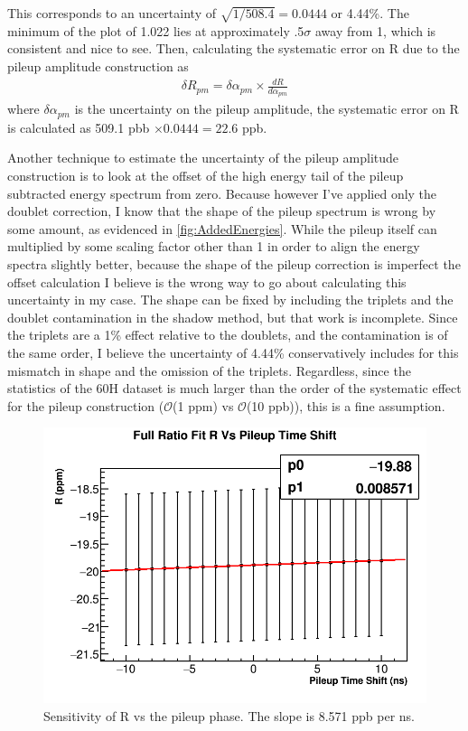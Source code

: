 This corresponds to an uncertainty of $\sqrt{1/508.4} = 0.0444$ or 4.44\%. The minimum of the \chisq plot of 1.022 lies at approximately .5$\sigma$ away from 1, which is consistent and nice to see. Then, calculating the systematic error on R due to the pileup amplitude construction as 
	\begin{align}
		\delta R_{pm} = \delta\alpha_{pm} \times \frac{dR}{d\alpha_{pm}}
	\end{align}
where $\delta\alpha_{pm}$ is the uncertainty on the pileup amplitude, the systematic error on R is calculated as 509.1 pbb $\times 0.0444 = 22.6$ ppb.

Another technique to estimate the uncertainty of the pileup amplitude construction is to look at the offset of the high energy tail of the pileup subtracted energy spectrum from zero. Because however I've applied only the doublet correction, I know that the shape of the pileup spectrum is wrong by some amount, as evidenced in \ref{fig:AddedEnergies}. While the pileup itself can multiplied by some scaling factor other than 1 in order to align the energy spectra slightly better, because the shape of the pileup correction is imperfect the offset calculation I believe is the wrong way to go about calculating this uncertainty in my case. The shape can be fixed by including the triplets and the doublet contamination in the shadow method, but that work is incomplete. Since the triplets are a 1\% effect relative to the doublets, and the contamination is of the same order, I believe the uncertainty of 4.44\% conservatively includes for this mismatch in shape and the omission of the triplets. Regardless, since the statistics of the 60H dataset is much larger than the order of the systematic effect for the pileup construction ($\mathcal{O}$(1 ppm) vs $\mathcal{O}$(10 ppb)), this is a fine assumption.

\begin{figure}[h]
	\centering
	\includegraphics[width=.5\textwidth]{RatioCBO_R_Vs_PileupTimeShift_Canv}
    \caption[PileupPhase]{Sensitivity of R vs the pileup phase. The slope is 8.571 ppb per ns.}
    \label{fig:PileupPhase}
\end{figure}

